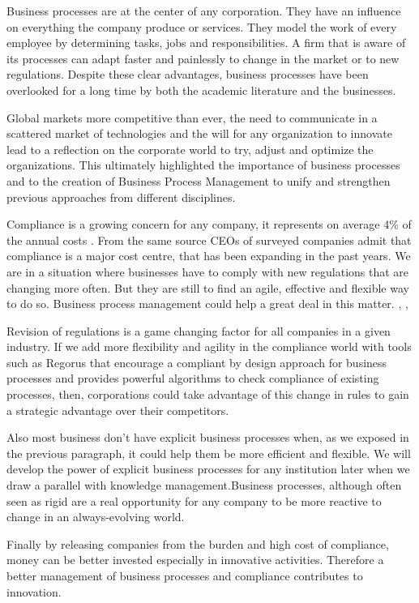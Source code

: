 \documentclass[10pt]{report}
\begin{document}
Business processes are at the center of any corporation. They have an influence on everything the company produce or services. They model the work of every employee by determining tasks, jobs and responsibilities. A firm that is aware of its processes can adapt faster and painlessly to change in the market or to new regulations. Despite these clear advantages, business processes have been overlooked for a long time by both the academic literature and the businesses. \autocite{dumas2013}

Global markets more competitive than ever, the need to communicate in a scattered market of technologies and the will for any organization to innovate lead to a reflection on the corporate world to try, adjust and optimize the organizations. This ultimately highlighted the importance of business processes and to the creation of Business Process Management to unify and strengthen previous approaches from different disciplines. \autocite{dumas2013}

Compliance is a growing concern for any company, it represents on average 4\% of the annual costs \autocite{IBT2011}. From the same source CEOs of surveyed companies admit that compliance is a major cost centre, that has been expanding in the past years. We are in a situation where businesses have to comply with new regulations that are changing more often. But they are still to find an agile, effective and flexible way to do so. Business process management could help a great deal in this matter. \autocite{goedertier2006}, \autocite{dumas2013}, \autocite{jeston2014}

Revision of regulations is a game changing factor for all companies in a given industry. If we add more flexibility and agility in the compliance world with tools such as Regorus that encourage a compliant by design approach for business processes and provides powerful algorithms to check compliance of existing processes, then, corporations could take advantage of this change in rules to gain a strategic advantage over their competitors.

Also most business don't have explicit business processes when, as we exposed in the previous paragraph, it could help them be more efficient and flexible. We will develop the power of explicit business processes for any institution later when we draw a parallel with knowledge management.Business processes, although often seen as rigid are a real opportunity for any company to be more reactive to change in an always-evolving world.

Finally by releasing companies from the burden and high cost of compliance, money can be better invested especially in innovative activities. Therefore a better management of business processes and compliance contributes to innovation.
\end{document}
